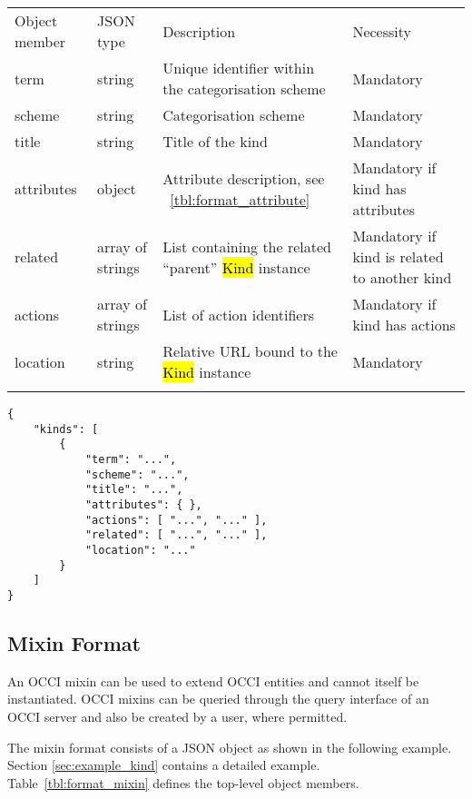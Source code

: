 \documentclass[10pt,a4paper]{article}
\begin{document}
 {
    \begin{tabular}{llll}
    \toprule
    Object member & JSON type & Description & Necessity\\
    \colrule
    term & string & Unique identifier within the categorisation scheme & Mandatory\\
    scheme & string & Categorisation scheme & Mandatory\\
    title & string & Title of the kind & Mandatory\\
    attributes & object & Attribute description, see ~\ref{tbl:format_attribute} & Mandatory if kind has attributes\\
    related & array of strings & List containing the related ``parent'' \hl{Kind} instance & Mandatory if kind is related to another kind\\
    actions & array of strings & List of action identifiers & Mandatory if kind has actions\\
    location & string & Relative URL bound to the \hl{Kind} instance & Mandatory\\
    \botrule
    \end{tabular}
}

\begin{verbatim}
{
    "kinds": [
        {
            "term": "...",
            "scheme": "...",
            "title": "...",
            "attributes": { },
            "actions": [ "...", "..." ],
            "related": [ "...", "..." ],
            "location": "..."
        }
    ]
}
\end{verbatim}

\subsection{Mixin Format}
\label{sec:format_mixin}

An OCCI mixin can be used to extend OCCI entities and cannot itself be 
instantiated. OCCI mixins can be queried through the query interface 
of an OCCI server and also be created by a user, where permitted.

The mixin format consists of a JSON object as shown in the
following example. Section \ref{sec:example_kind} contains a detailed example.
Table~\ref{tbl:format_mixin} defines the top-level object members.
\end{document}
